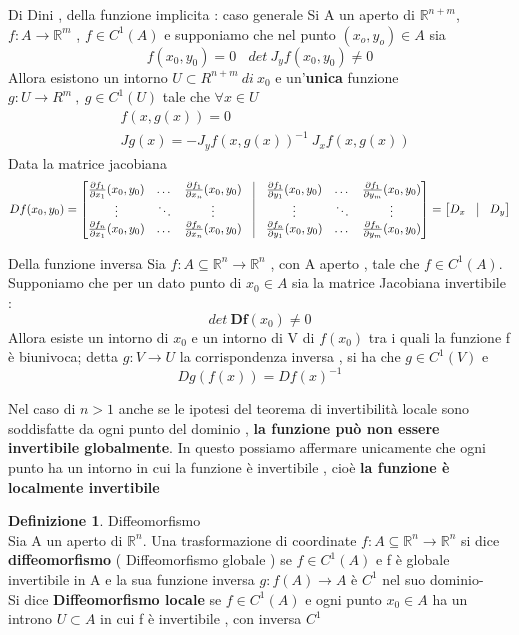 \documentclass{article}
\theoremstyle{definition}
\newtheorem*{definizione}{Definizione}
\newcommand{\R}{\mathbb{R}}
\newcommand{\Rn}{\R^n}
\newcommand{\fnn}{f: A\subseteq \Rn \rightarrow \Rn}
\begin{document}
	\begin{teo}{Di Dini , della funzione implicita : caso generale }{}
		Si A un aperto di $\R^{n+m}$, $f:A \rightarrow \R^m$ , $ f \in C^1(A)$ e supponiamo che nel punto $(x_o,y_o) \in A$ sia $$f(x_0,y_0)=0 \ \ \ \ det \ J_yf(x_0,y_0)\neq 0$$
		Allora esistono un intorno $U \subset R^{n+m}\ di \ x_0$ e un'\textbf{unica} funzione $g: U \rightarrow R^m \ , \ g \in C^1(U)$ tale che $\forall x \in U$ 
		\begin{align*}
			&f(x,g(x)) =0 \\
			&Jg(x)= - J_yf(x,g(x))^{-1} \ J_xf(x,g(x))
		\end{align*}
		Data la matrice jacobiana 
		$$Df(x_0,y_0) = \begin{bmatrix}
			\frac{\partial f_1}{\partial x_1}(x_0,y_0) &\dots &\frac{\partial f_1}{\partial x_n }(x_0,y_0) &\vline & \frac{\partial f_1}{\partial y_1}(x_0,y_0) & \dots & \frac{\partial f_1}{\partial y_m}(x_0,y_0) \\ 
			\vdots & \ddots & \vdots & \vline & \vdots & \ddots & \vdots \\ 
			\frac{\partial f_n}{\partial x_1}(x_0,y_0) &\dots &\frac{\partial f_n}{\partial x_n }(x_0,y_0) &\vline & \frac{\partial f_n}{\partial y_1}(x_0,y_0) & \dots & \frac{\partial f_n}{\partial y_m}(x_0,y_0) 
		\end{bmatrix}=\begin{bmatrix}
			D_x & \vline & D_y
		\end{bmatrix}$$
	\end{teo}
	\begin{teo}{	Della funzione inversa  }{}
		Sia $\fnn$ , con A aperto , tale che $f \in C^1(A)$. \\ Supponiamo che per un dato punto di $x_0 \in A$ sia la matrice Jacobiana invertibile : $$det \ \textbf{Df}(x_0)\neq 0$$
		Allora esiste un intorno di $x_0$ e un intorno di V di $f(x_0)$ tra i quali la funzione f è biunivoca; detta $g: V \rightarrow U$ la corrispondenza inversa , si ha che $g \in C^1(V)$ e 
		$$Dg(f(x))=Df(x)^{-1}$$
	\end{teo}
	Nel caso di $ n > 1$ anche se le ipotesi del teorema di invertibilità locale sono soddisfatte da ogni punto del dominio , \textbf{la funzione può non essere invertibile globalmente}. In questo possiamo affermare unicamente che ogni punto ha un intorno in cui la funzione è invertibile , cioè \textbf{la funzione è localmente invertibile}
	\begin{definizione}
		Diffeomorfismo \\
		Sia A un aperto di $\Rn$. Una trasformazione di coordinate $\fnn$ si dice \textbf{diffeomorfismo} ( Diffeomorfismo globale ) se $f \in C^1(A)$ e f è globale invertibile in A e la sua funzione inversa $g:f(A) \rightarrow A$ è $C^1$ nel suo dominio-\\
		Si dice\textbf{ Diffeomorfismo locale } se  $f \in C^1(A)$ e ogni punto $x_0 \in A$ ha un introno $U \subset A$ in cui f è invertibile , con inversa $C^1$
		
	\end{definizione}
\end{document}

